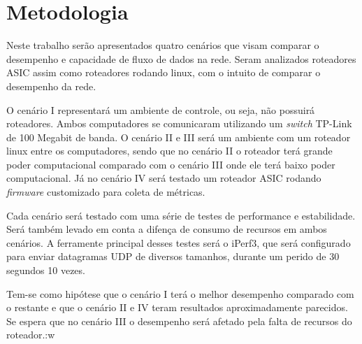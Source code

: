 \section{Metodologia}
Neste trabalho serão apresentados quatro cenários que visam comparar o desempenho e capacidade de fluxo de dados na rede. Seram analizados roteadores \ac{ASIC} assim como roteadores rodando linux, com o intuito de comparar o desempenho da rede. 

O cenário I representará um ambiente de controle, ou seja, não possuirá roteadores. Ambos computadores se comunicaram utilizando um \textit{switch} TP-Link de 100 Megabit de banda. O cenário II e III será um ambiente com um roteador linux entre os computadores, sendo que no cenário II o roteador terá grande poder computacional comparado com o cenário III onde ele terá baixo poder computacional. Já no cenário IV será testado um roteador \ac{ASIC} rodando \textit{firmware} customizado para coleta de métricas.

Cada cenário será testado com uma série de testes de performance e estabilidade. Será também levado em conta a difença de consumo de recursos em ambos cenários. A ferramente principal desses testes será o iPerf3, que será configurado para enviar datagramas UDP de diversos tamanhos, durante um perido de 30 segundos 10 vezes.

Tem-se como hipótese que o cenário I terá o melhor desempenho comparado com o restante e que o cenário II e IV teram resultados aproximadamente parecidos. Se espera que no cenário III o desempenho será afetado pela falta de recursos do roteador.:w


